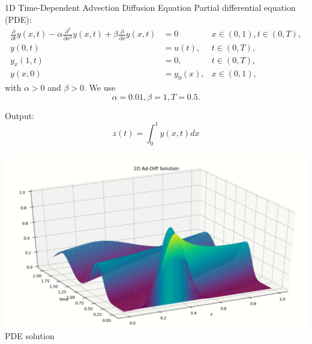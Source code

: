 \begin{frame}{1D Time-Dependent Advection Diffusion Equation}
	Partial differential equation (PDE):
	 \begin{align*}
                         \frac{\partial}{\partial t} y(x,t) 
                        - \alpha \frac{\partial^2}{\partial x^2} y(x,t) +  \beta \frac{\partial}{\partial x} y(x,t) &= 0
                                                & x \in (0,1), t \in (0,T), \\
                         y(0,t) &= u(t),    & t \in (0,T), \\
                         y_x(1,t) &= 0,    & t \in (0,T), \\
                         y(x,0) &= y_0(x),  & x \in (0,1),
          \end{align*}
          with $\alpha > 0$ and $\beta >0$. We use
         \[
                \alpha=0.01, \beta = 1, T=0.5.
          \]
        \begin{minipage}[c]{0.6\textwidth}
	Output:
	\[
	   z(t) = \int_{0}^{1} y(x,t) dx
	\]
	\end{minipage} \hfil
         \begin{minipage}[c]{0.35\textwidth}
	\begin{center}
               \includegraphics[width=1.0\textwidth]{figures/1D_addiffsol.PNG}\\
               PDE solution
	\end{center}
	\end{minipage}
\end{frame}



